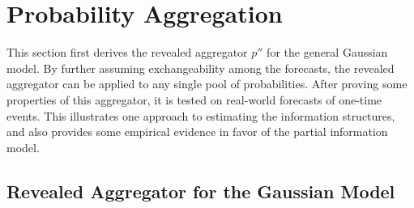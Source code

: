\documentclass[11pt]{article}
\theoremstyle{definition}
\theoremstyle{definition}
\begin{document}
\section{Probability Aggregation}
\label{aggregation}

This section first derives the revealed aggregator $p''$ for the
general Gaussian model. By further assuming
exchangeability among the forecasts, the revealed aggregator can be
applied to any single pool of probabilities. After proving some
properties of this aggregator, it is
tested on real-world forecasts of one-time events. This
illustrates one approach to estimating the information structures, and also provides some empirical evidence in favor of the
partial information model.

\subsection{Revealed Aggregator for the Gaussian Model}
\end{document}
